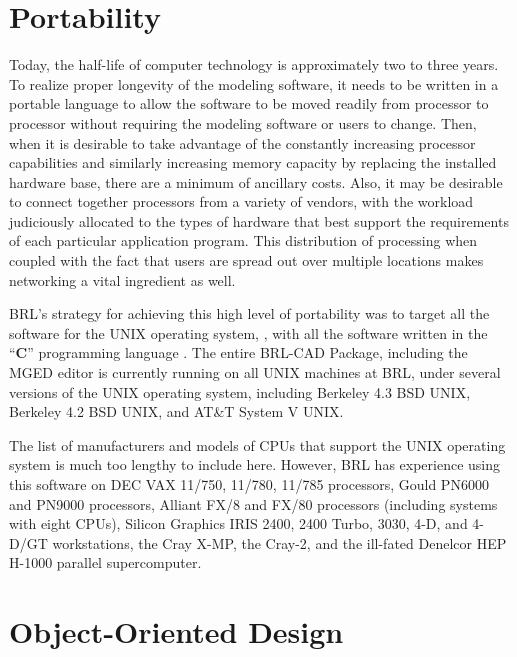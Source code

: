 \section{Portability}

Today, the half-life of computer technology is
approximately two to three years.
To realize proper longevity of the modeling software, it needs to be written
in a portable language to allow the software to be moved readily from
processor to processor without requiring the modeling software or users
to change.
Then, when it is desirable to
take advantage of the constantly increasing
processor capabilities and similarly increasing memory capacity by replacing
the installed hardware base, there are a minimum of ancillary costs.
Also, it may be desirable to connect together processors from a variety
of vendors, with the workload judiciously allocated to
the types of hardware that best support the requirements of each particular
application program.
This distribution of processing when coupled with the fact that
users are spread out over multiple locations makes networking a vital
ingredient as well.

BRL's strategy for achieving this high level of portability was to target
all the software for the UNIX operating system,
\cite{unix-ts-sys},
with all the software written in the ``{\bf C}''
programming language \cite{c-prog-lang}.
The entire BRL-CAD Package, including the MGED editor
is currently running on all UNIX machines at BRL,
under several versions of the UNIX operating system, including
Berkeley 4.3 BSD UNIX, Berkeley 4.2 BSD UNIX, and AT\&T System V UNIX.

The list of manufacturers and models of CPUs that support the UNIX
operating system \cite{modern-tools-hi-res}
is much too lengthy to include here.  However, BRL
has experience using this software on
DEC VAX 11/750, 11/780, 11/785 processors,
Gould PN6000 and PN9000 processors,
Alliant FX/8 and FX/80 processors (including systems with eight CPUs),
Silicon Graphics IRIS 2400, 2400 Turbo, 3030, 4-D, and 4-D/GT workstations,
the Cray X-MP, the Cray-2,
and the ill-fated Denelcor HEP H-1000 parallel supercomputer.

\section{Object-Oriented Design}

